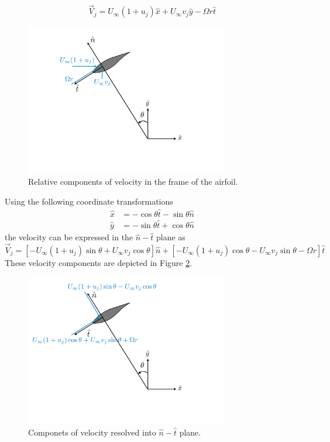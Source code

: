 \documentclass{article}
\begin{document}
\[ \vec{V}_j = U_\infty(1+u_j) \hat{x} + U_\infty v_j \hat{y} - \Omega r \hat{t} \]

\begin{figure}[htbp]
\begin{center}
\includegraphics[width=3.5in]{images/velocity}
\caption{Relative components of velocity in the frame of the airfoil.}
\label{fig:velocity}
\end{center}
\end{figure}

Using the following coordinate transformations
\begin{align*}
 \hat{x} &= -\cos\theta\hat{t} - \sin\theta\hat{n}\\
 \hat{y} &= -\sin\theta\hat{t} + \cos\theta\hat{n}
\end{align*}
the velocity can be expressed in the $\hat{n}-\hat{t}$ plane as
\[ \vec{V}_j = \left[ - U_\infty(1+u_j) \sin\theta + U_\infty v_j \cos\theta\right]\hat{n} + \left[ - U_\infty(1+u_j) \cos\theta - U_\infty v_j \sin\theta -\Omega r \right]\hat{t} \]
These velocity components are depicted in Figure \ref{fig:components}.

\begin{figure}[htbp]
\begin{center}
\includegraphics[width=3.5in]{images/components}
\caption{Componets of velocity resolved into $\hat{n}-\hat{t}$ plane.}
\label{fig:components}
\end{center}
\end{figure}
\end{document}
